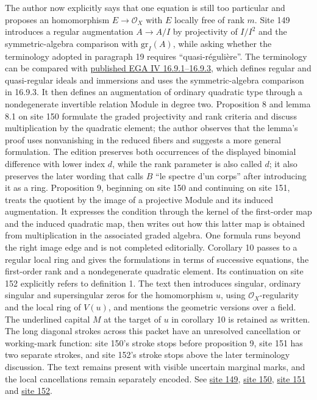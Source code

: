 \documentclass[10pt,a4paper]{article}
\begin{document}
The author now explicitly says that one equation is still too particular and proposes an homomorphism $E\longrightarrow\mathcal O_X$ with $E$ locally free of rank $m$. Site 149 introduces a regular augmentation $A\longrightarrow A/I$ by projectivity of $I/I^2$ and the symmetric-algebra comparison with $\mathrm{gr}_I(A)$, while asking whether the terminology adopted in paragraph 19 requires ``quasi-régulière''. The terminology can be compared with \href{https://www.numdam.org/articles/10.1007/BF02732123/}{published EGA IV 16.9.1--16.9.3}, which defines regular and quasi-regular ideals and immersions and uses the symmetric-algebra comparison in 16.9.3. It then defines an augmentation of ordinary quadratic type through a nondegenerate invertible relation Module in degree two. Proposition 8 and lemma 8.1 on site 150 formulate the graded projectivity and rank criteria and discuss multiplication by the quadratic element; the author observes that the lemma's proof uses nonvanishing in the reduced fibers and suggests a more general formulation. The edition preserves both occurrences of the displayed binomial difference with lower index $d$, while the rank parameter is also called $d$; it also preserves the later wording that calls $B$ ``le spectre d'un corps'' after introducing it as a ring. Proposition 9, beginning on site 150 and continuing on site 151, treats the quotient by the image of a projective Module and its induced augmentation. It expresses the condition through the kernel of the first-order map and the induced quadratic map, then writes out how this latter map is obtained from multiplication in the associated graded algebra. One formula runs beyond the right image edge and is not completed editorially. Corollary 10 passes to a regular local ring and gives the formulations in terms of successive equations, the first-order rank and a nondegenerate quadratic element. Its continuation on site 152 explicitly refers to definition 1. The text then introduces singular, ordinary singular and supersingular zeros for the homomorphism $u$, using $\mathcal O_X$-regularity and the local ring of $V(u)$, and mentions the geometric versions over a field. The underlined capital $M$ at the target of $u$ in corollary 10 is retained as written. The long diagonal strokes across this packet have an unresolved cancellation or working-mark function: site 150's stroke stops before proposition 9, site 151 has two separate strokes, and site 152's stroke stops above the later terminology discussion. The text remains present with visible uncertain marginal marks, and the local cancellations remain separately encoded. See \href{https://grothendieck.umontpellier.fr/web/viewer.html?file=../25.pdf#page=150}{site 149}, \href{https://grothendieck.umontpellier.fr/web/viewer.html?file=../25.pdf#page=151}{site 150}, \href{https://grothendieck.umontpellier.fr/web/viewer.html?file=../25.pdf#page=152}{site 151} and \href{https://grothendieck.umontpellier.fr/web/viewer.html?file=../25.pdf#page=153}{site 152}.
\end{document}
